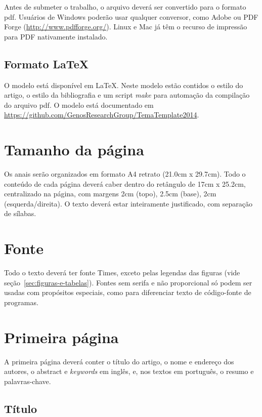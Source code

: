 \documentclass[12pt]{article}
\begin{document}
Antes de submeter o trabalho, o arquivo deverá ser convertido para o
formato pdf. Usuários de Windows poderão usar qualquer conversor, como
Adobe ou PDF Forge (\url{http://www.pdfforge.org/}). Linux e Mac já
têm o recurso de impressão para PDF nativamente instalado.

\subsection{Formato \LaTeX}
\label{sec:latex}

O modelo está disponível em \LaTeX{}. Neste modelo estão contidos o
estilo do artigo, o estilo da bibliografia e um script \textit{make}
para automação da compilação do arquivo pdf. O modelo está documentado
em \url{https://github.com/GenosResearchGroup/TemaTemplate2014}.

\section{Tamanho da página}
\label{sec:tamanho-pagina}

Os anais serão organizados em formato A4 retrato (21.0cm x 29.7cm).
Todo o conteúdo de cada página deverá caber dentro do retângulo de
17cm x 25.2cm, centralizado na página, com margens 2cm (topo), 2.5cm
(base), 2cm (esquerda/direita). O texto deverá estar inteiramente
justificado, com separação de sílabas.

\section{Fonte}
\label{sec:fonte}

Todo o texto deverá ter fonte Times, exceto pelas legendas das figuras
(vide seção~\ref{sec:figuras-e-tabelas}). Fontes sem serifa e não
proporcional só podem ser usadas com propósitos especiais, como para
diferenciar texto de código-fonte de programas.

\section{Primeira página}

A primeira página deverá conter o título do artigo, o nome e endereço
dos autores, o abstract e \textit{keywords} em inglês, e, nos textos
em português, o resumo e palavras-chave.

\subsection{Título}
\label{sec:titulo}
\end{document}
